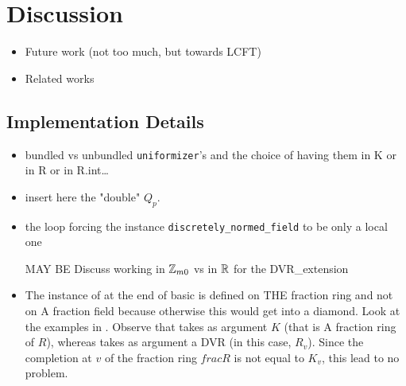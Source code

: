 \documentclass[sigplan,10pt,anonymous,review]{acmart}\settopmatter{printfolios=true,printccs=false,printacmref=false}
\begin{document}
\section{Discussion}
\begin{itemize}
\item Future work (not too much, but towards LCFT)
\item Related works
\end{itemize}
\subsection{Implementation Details}
\begin{itemize}
\item bundled vs unbundled \texttt{uniformizer}'s and the choice of having them in K or in R or in R.int\dots
\item insert here the "double" $Q_p$.
\item the loop forcing the instance \texttt{discretely\_normed\_field} to be only a local one
\item [MAY BE] Discuss working in $\mathbb{Z}_{m0}$ vs in $\mathbb{R}$ for the DVR\_extension
\item The instance of  at the end of basic is defined on THE fraction ring and not on A fraction field because otherwise this would get into a diamond. Look at the examples in . Observe that  takes as argument $K$ (that is A fraction ring of $R$), whereas  takes as argument a DVR (in this case, $R_v$). Since the completion at $v$ of the fraction ring $frac R$ is not equal to $K_v$, this lead to no problem.
\end{itemize}
\end{document}
